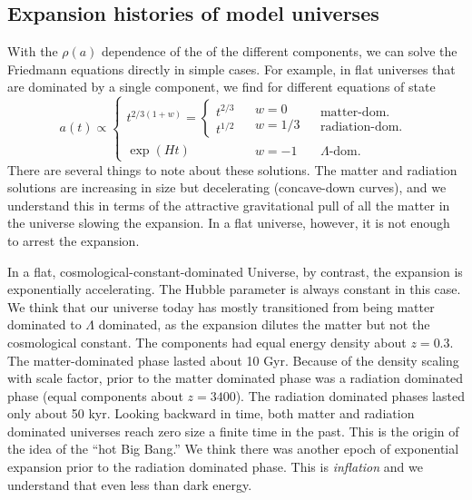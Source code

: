 \subsection{Expansion histories of model universes}
With the $\rho(a)$ dependence of the of the different components, we can solve the Friedmann equations directly in simple cases.  For example, in flat universes that are dominated by a single component, we find for different equations of state 
\begin{equation}
  a(t) \propto \left\{
  \begin{array}{lll}
    t^{2/3(1+w)}  = \left\{ \begin{array}{l} t^{2/3}\\ t^{1/2} \end{array} \right. & \begin{array}{l} w=0  \\ w = 1/3 \end{array} &  \begin{array}{l} \mbox{matter-dom.}  \\ \mbox{radiation-dom.} \end{array} \\
    \exp(Ht) & \begin{array}{l}w = -1 \end{array}& \begin{array}{l} \Lambda\mbox{-dom.} \end{array}
  \end{array}
  \right. 
\end{equation}
There are several things to note about these solutions.  The matter and radiation solutions are increasing in size but decelerating (concave-down curves), and we understand this in terms of the attractive gravitational pull of all the matter in the universe slowing the expansion.  In a flat universe, however, it is not enough to arrest the expansion.

In a flat, cosmological-constant-dominated Universe, by contrast, the expansion is exponentially accelerating.  The Hubble parameter is always constant in this case.   We think that our universe today has mostly transitioned from being matter dominated to $\Lambda$ dominated, as the expansion dilutes the matter but not the cosmological constant.  The components had equal energy density about $z=0.3$.  The matter-dominated phase lasted about 10 Gyr.  Because of the density scaling with scale factor, prior to the matter dominated phase was a radiation dominated phase (equal components about $z=3400$).  The radiation dominated phases lasted only about 50 kyr.  Looking backward in time, both matter and radiation dominated universes reach zero size a finite time in the past.  This is the origin of the idea of the ``hot Big Bang.''  We think there was another epoch of exponential expansion prior to the radiation dominated phase.  This is \textit{inflation} and we understand that even less than dark energy.

